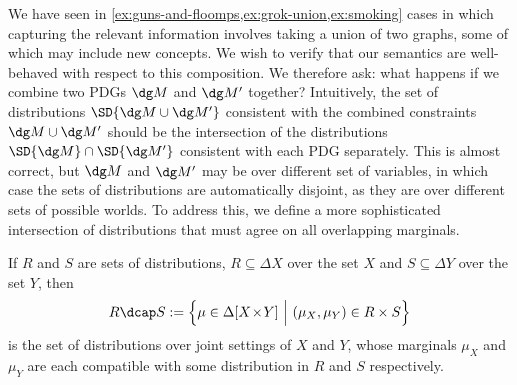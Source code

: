 {    %
    We have seen
    	in \cref{ex:guns-and-floomps,ex:grok-union,ex:smoking} cases in
    	which capturing the relevant information involves taking a
    	union of two graphs, some of which may include new
    	concepts. We wish to verify that our semantics are
    	well-behaved with respect to this composition.	  
    We therefore ask: what happens if we combine two PDGs $\dg M$
    	and $\dg M'$ together? Intuitively, the set of distributions
    	$\SD{\dg M \cup \dg M'}$ consistent with the combined
    	constraints $\dg M\cup \dg M'$ should be the intersection of the
    	distributions $\SD{\dg M} \cap \SD{\dg M'}$ consistent
    	with each PDG separately. This is almost correct, but $\dg M$
    	and $\dg M'$ may be over different set of variables, in which
    	case the sets of distributions are automatically disjoint, as
    	they are over different sets of possible worlds. To address
    	this, we define a more sophisticated intersection of
    	distributions that must agree on all overlapping
    	marginals. %

    \begin{defn}[$\dcap$]\label{def:marginal-dist-intersection}
    	If $R$ and $S$ are sets of distributions, $R \subseteq \Delta X$ over the set $X$ and $S\subseteq \Delta Y$ over the set $Y$, then
    		{$$R \dcap S := \Big\{ \mu \in  \Delta [X \!\times\! Y] ~\Big|~ (\mu_{X}, \mu_{Y}) \in R \times S \Big\}  $$}%
    	is the set of distributions over joint settings of $X$ and $Y$, whose marginals $\mu_X$ and $\mu_Y$ are each compatible with some distribution in $R$ and $S$ respectively. 
    	

\end{defn}}
